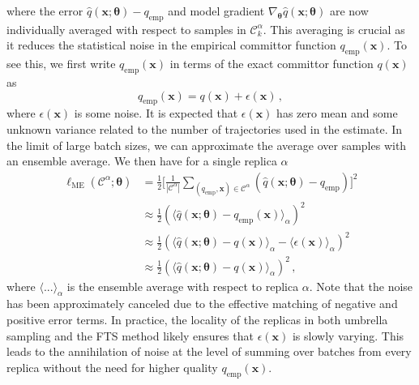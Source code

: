 \documentclass{article}
\numberwithin{equation}{section}
\def\*#1{\mathbf{#1}}
\theoremstyle{definition}
\theoremstyle{remark}
\def\thetab{\boldsymbol{\theta}}
\begin{document}
where the error $ \hat{q}(\* x; \thetab) - q_\mathrm{emp} $ and model gradient $  \nabla_{\thetab} \hat{q}(\* x ; \thetab) $ are now individually averaged with respect to samples in $ \mathcal{C}_{k}^{\alpha} $. This averaging is crucial as it reduces the statistical noise in the empirical committor function $q_\mathrm{emp}(\* x)$.
To see this, we first write $ q_{\mathrm{emp}}(\* x) $ in terms of the exact committor function $ q (\* x) $ as
\begin{equation}
    q_{\mathrm{emp}}(\* x) = q (\* x) + \epsilon (\* x) \,,
\end{equation}
where $ \epsilon (\* x)  $ is some noise.
It is expected that $ \epsilon (\* x) $ has zero mean and some unknown variance related to the number of trajectories used in the estimate.
In the limit of large batch sizes, we can approximate the average over samples with an ensemble average. We then have for a single replica $ \alpha $ 
\begin{align}
    \ell_{\mathrm{ME}}(\mathcal{C}^{\alpha}; \thetab) &= \frac{1}{2}\Bigg[\frac{1}{|\mathcal{C}^{\alpha}|} \sum_{ ( q_\mathrm{emp}, \* x ) \in \mathcal{C}^{\alpha}}( \hat{q}(\* x; \thetab) - q_\mathrm{emp} ) \Bigg]^2 \\
    &\approx \frac{1}{2} \left(\langle \hat{q}(\* x; \thetab) - q_\mathrm{emp}(\*x ) \rangle_\alpha\right)^2 \\
    &\approx \frac{1}{2} \left( \langle \hat{q}(\* x; \thetab) - q (\*x ) \rangle_\alpha - \langle \epsilon (\* x) \rangle_\alpha \right)^2
    \\ 
    &\approx \frac{1}{2} \left( \langle \hat{q}(\* x; \thetab) - q (\*x )\rangle_\alpha \right)^2 \,,
\end{align}
where $ \langle ... \rangle_{\alpha} $ is the ensemble average with respect to replica $ \alpha $.
Note that the noise has been approximately canceled due to the effective matching of negative and positive error terms.
In practice, the locality of the replicas in both umbrella sampling and the FTS method likely ensures that $ \epsilon (\* x) $ is slowly varying.
This leads to the annihilation of noise at the level of summing over batches from every replica without the need for higher quality $ q_{\mathrm{emp}}( \* x ) $.
\end{document}
